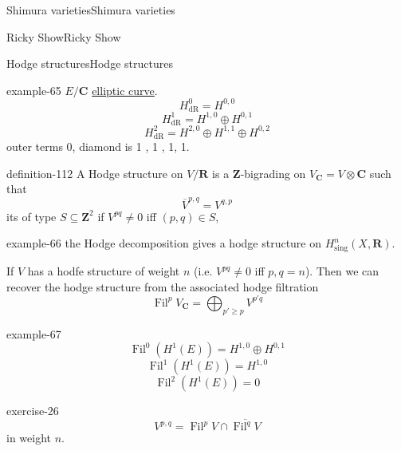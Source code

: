 \documentclass[10pt,]{book}
\numberwithin{equation}{section}
\newcommand{\ZZ}{\mathbf{Z}}
\newcommand{\RR}{\mathbf{R}}
\newcommand{\CC}{\mathbf{C}}
\newcommand{\dR}{\mathrm{dR}}
\DeclareMathOperator{\Fil}{Fil}
\begin{document}
\begin{chapterptx}{Shimura varieties}{}{Shimura varieties}{}{}
\begin{sectionptx}{Ricky Show}{}{Ricky Show}{}{}
\begin{subsectionptx}{Hodge structures}{}{Hodge structures}{}{}
\begin{example}{}{example-65}
\hypertarget{p-1142}{}%
\(E/\CC\) \hyperref[def-supersing-isog-ec]{elliptic curve}.%
\begin{equation*}
H^0_\dR = H^{0,0}
\end{equation*}
%
\begin{equation*}
H^1_\dR = H^{1,0} \oplus H^{0,1}
\end{equation*}
%
\begin{equation*}
H^2_\dR = H^{2,0} \oplus H^{1,1} \oplus H^{0,2}
\end{equation*}
outer terms 0, diamond is  1 , 1 , 1, 1.%
\end{example}
\begin{definition}{}{definition-112}%
\hypertarget{p-1143}{}%
A Hodge structure on \(V/\RR\) is a \(\ZZ\)-bigrading on \(V_\CC = V \otimes \CC\) such that%
\begin{equation*}
\overline V^{p,q}  = V^{q,p}
\end{equation*}
its of type \(S\subseteq \ZZ^2\) if \(V^{pq} \ne 0 \) iff \((p,q) \in S\),%
\end{definition}
\begin{example}{}{example-66}%
\hypertarget{p-1144}{}%
the Hodge decomposition gives a hodge structure on \(H^n_{\mathrm{sing}}(X, \RR)\).%
\end{example}
\hypertarget{p-1145}{}%
If \(V\) has a hodfe structure of weight \(n\) (i.e. \(V^{pq} \ne 0\) iff \(p,q = n\)). Then we can recover the hodge structure from the associated hodge filtration%
\begin{equation*}
\Fil^p V_\CC = \bigoplus_{p' \ge p} V^{p' q}
\end{equation*}
%
\begin{example}{}{example-67}%
\hypertarget{p-1146}{}%
%
\begin{equation*}
\Fil^0(H^1(E)) = H^{1,0} \oplus H^{0,1}
\end{equation*}
%
\begin{equation*}
\Fil^1(H^1(E)) = H^{1,0}
\end{equation*}
%
\begin{equation*}
\Fil^2(H^1(E)) = 0
\end{equation*}
%
\end{example}
\begin{inlineexercise}{}{exercise-26}%
\hypertarget{p-1147}{}%
%
\begin{equation*}
V^{p,q} = \Fil^p V \cap \overline {\Fil^q V}
\end{equation*}
in weight \(n\).%
\end{inlineexercise}

\end{subsectionptx}
\end{sectionptx}
\end{chapterptx}
\end{document}
